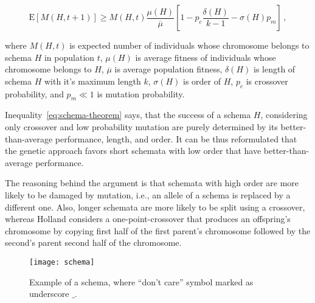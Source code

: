 \begin{equation}
    \mathrm{E}[M(H, t+1)] \geq M(H, t) \dfrac{\mu(H)}{\overline{\mu}}\left[ 1 - p_c \dfrac{\delta(H)}{k-1} - \sigma(H)
    p_m \right]\,,
    \label{eq:schema-theorem}
\end{equation}

where $M(H, t)$ is expected number of individuals whose chromosome belongs to schema $H$ in population $t$,
$\mu(H)$ is average fitness of individuals whose chromosome belongs to $H$,
$\overline{\mu}$ is average population fitness,
$\delta(H)$ is length of schema $H$ with it’s maximum length $k$,
$\sigma(H)$ is order of $H$,
$p_c$ is crossover probability, and
$p_m \ll 1$ is mutation probability.

Inequality~\ref{eq:schema-theorem} says, that the success of a schema $H$,
considering only crossover and low probability mutation are purely determined
by its better-than-average performance, length, and order.
It can be thus reformulated that the genetic approach favors
short schemata with low order that have better-than-average performance.

The reasoning behind the argument is that schemata with high order are more likely
to be damaged by mutation, i.e., an allele of a schema is replaced by a different one.
Also, longer schemata are more likely to be split using a crossover, whereas Holland
considers a one-point-crossover that produces an offspring’s chromosome by copying
first half of the first parent’s chromosome followed by the second’s parent second half of the chromosome.

\begin{figure}[h]
    \texttt{[image: schema]}
    \caption[Example of a schema]{Example of a schema, where “don’t care” symbol marked as underscore $\_$.}
    \label{fig:schema}
\end{figure}
